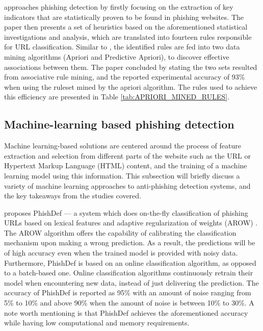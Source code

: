 \cite{INTELLIGENT_RULE_MINING} approaches phishing detection by firstly focusing
on the extraction of key indicators that are statistically proven to be found in
phishing websites. The paper then presents a set of heuristics based on the
aforementioned statistical investigations and analysis, which are translated
into fourteen rules responsible for URL classification. Similar to
\cite{RULE_BASED_CLASSIFICATION}, the identified rules are fed into two data
mining algorithms (Apriori and Predictive Apriori), to discover effective
associations between them. The paper concluded by stating the two sets resulted
from associative rule mining, and the reported experimental accuracy of 93\%
when using the ruleset mined by the apriori algorithm. The rules used to achieve
this efficiency are presented in Table \ref{tab:APRIORI_MINED_RULES}.

\subsection{Machine-learning based phishing detection}

Machine learning-based solutions are centered around the process of feature
extraction and selection from different parts of the website such as the URL or
Hypertext Markup Language (HTML) content, and the training of a machine learning model using this
information. This subsection will briefly discuss a variety of machine learning
approaches to anti-phishing detection systems, and the key takeaways from the
studies covered.

\cite{URL_SAYS_ALL} proposes PhishDef --- a system which does on-the-fly
classification of phishing URLs based on lexical features and adaptive
regularization of weights (AROW) \citep{AROW}. The AROW algorithm offers the capability
of calibrating the classification mechanism upon making a wrong prediction. As a
result, the predictions will be of high accuracy even when the trained model is
provided with noisy data. Furthermore, PhishDef is based on an online
classification algorithm, as opposed to a batch-based one. Online classification
algorithms continuously retrain their model when encountering new data, instead
of just delivering the prediction. The accuracy of PhishDef is reported as 95\%
with an amount of noise ranging from 5\% to 10\% and above 90\% when the amount
of noise is between 10\% to 30\%. A note worth mentioning is that PhishDef
achieves the aforementioned accuracy while having low computational and memory
requirements.

